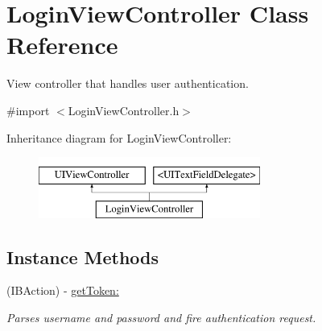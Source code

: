 \hypertarget{interface_login_view_controller}{\section{Login\-View\-Controller Class Reference}
\label{interface_login_view_controller}
}


View controller that handles user authentication.  




{\ttfamily \#import $<$Login\-View\-Controller.\-h$>$}

Inheritance diagram for Login\-View\-Controller\-:\begin{figure}[H]
\begin{center}
\leavevmode
\includegraphics[height=2.000000cm]{interface_login_view_controller}
\end{center}
\end{figure}
\subsection*{Instance Methods}
\begin{DoxyCompactItemize}
\item 
(I\-B\-Action) -\/ \hyperlink{interface_login_view_controller_a89bdb3a2df5907f5902ddc31f1cdcf10}{get\-Token\-:}
\begin{DoxyCompactList}\small\item\em Parses username and password and fire authentication request. \end{DoxyCompactList}\end{DoxyCompactItemize}
